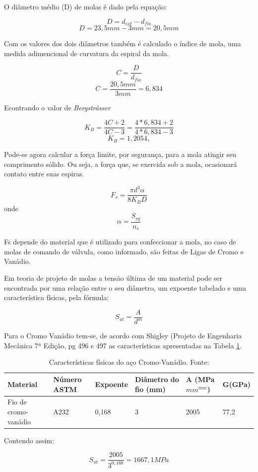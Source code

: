 O diâmetro médio (D) de molas é dado pela equação:

$$D=d_{ext}-d_{fio}$$
$$D=23,5mm-3mm=20,5mm$$

Com os valores dos dois diâmetros também é calculado o índice de mola, uma medida adimencional de curvatura da espiral da mola.

$$C=\frac{D}{d_{fio}}$$
$$C=\frac{20,5mm}{3mm}=6,834$$

Econtrando o valor de \textit{Bergsträsser}

$$K_B=\frac{4C+2}{4C-3}=\frac{4*6,834+2}{4*6,834-3}$$
$$K_B=1,2054,$$

Pode-se agora calcular a força limite, por segurança, para a mola atingir seu comprimento sólido. Ou seja, a força que, 
se exercida sob a mola, ocasionará contato entre suas espiras.

$$F_s=\frac{\pi d^3 \alpha}{8 K_B D}$$ onde $$\alpha=\frac{S_{sy}}{n_s}$$

Fs depende do material que é utilizado para confeccionar a mola, no caso de molas de comando de válvula, como informado, 
são feitas de Ligas de Cromo e Vanádio.

Em teoria de projeto de molas a tensão última de um material pode ser encontrada por uma relação entre o seu diâmetro, 
um expoente tabelado e uma característica físicas, pela fórmula:

$$S_{ut}=\frac{A}{d^m}$$

Para o Cromo Vanádio tem-se, de acordo com Shigley (Projeto de Engenharia Mecânica 7ª Edição, pg 496 e 497 as características apresentadas na Tabela \ref{tab:caracteristicas_cromovanadio}.

\begin{table}[H]
    \begin{tabular}{|p{2cm}|p{2cm}|p{2cm}|p{2cm}|p{2cm}|p{2cm}|}
        \hline
        \textbf{Material} & \textbf{Número ASTM} & \textbf{Expoente} & \textbf{Diâmetro do fio (mm)} & \textbf{A (MPa $mm^{mm}$)} & \textbf{G(GPa)} \\ \hline
        Fio de cromo-vanádio& A232& 0,168& 3&2005 &77,2                                                 \\ \hline
    \end{tabular}
    \caption{Características físicas do aço Cromo-Vanádio. Fonte: \cite{shigley}}
    \label{tab:caracteristicas_cromovanadio}
\end{table}


Contendo assim:

$$S_{ut}=\frac{2005}{3^{0,168}}=1667,1MPa$$

